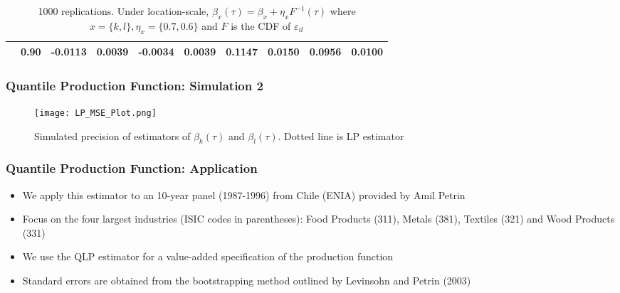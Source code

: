 \documentclass{beamer}
\begin{document}
\begin{frame}
\begin{itemize}
\begin{frame}
\begin{itemize}
\begin{frame}
\begin{itemize}
\begin{frame}
\begin{itemize}
\begin{frame}
\begin{table}[ht]
{\begin{tabular}{cccccccccc}
   & 0.90 & -0.0113 & 0.0039 & -0.0034 & 0.0039 & 0.1147 & 0.0150 & 0.0956 & 0.0100 \\ 
   \hline
\end{tabular}}
\caption*{1000 replications. Under location-scale, $\beta_{x}(\tau)=\beta_{x}+\eta_{x}F^{-1}(\tau)$ where $x=\{k,l\}, \eta_{x}=\{0.7, 0.6\}$ and $F$ is the CDF of $\varepsilon_{it}$}
\end{table}
\end{frame}


\begin{frame}
\frametitle{Quantile Production Function: Simulation 2}
\begin{figure}[H]
\centering
\caption{Simulated precision of estimators of $\beta_{k}(\tau)$ and $\beta_{l}(\tau)$. Dotted line is LP estimator}
\texttt{[image: LP\_MSE\_Plot.png]}
\end{figure}
\end{frame}



\begin{frame}
\frametitle{Quantile Production Function: Application}
\begin{itemize}
	\item We apply this estimator to an 10-year panel (1987-1996) from Chile (ENIA) provided by Amil Petrin 
	\item Focus on the four largest industries (ISIC codes in parentheses): Food Products (311), Metals (381), Textiles (321) and Wood Products (331)
	\item We use the QLP estimator for a value-added specification of the production function
	\item Standard errors are obtained from the bootstrapping method outlined by Levinsohn and Petrin (2003)
\end{itemize}
\end{frame}



\end{itemize}
\end{frame}
\end{itemize}
\end{frame}
\end{itemize}
\end{frame}
\end{itemize}
\end{frame}
\end{document}
